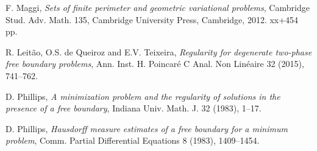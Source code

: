 \documentclass[11pt, reqno]{amsart}
\numberwithin{equation}{section}
\numberwithin{theorem}{section}
\numberwithin{lemma}{section}
\numberwithin{corollary}{section}
\numberwithin{remark}{section}
\numberwithin{proposition}{section}
\numberwithin{definition}{section}
\begin{document}
\begin{thebibliography}{99}
     F. Maggi, 
    \textit{Sets of finite perimeter and geometric variational problems}, 
    Cambridge Stud. Adv. Math. 135, Cambridge University Press, Cambridge, 2012. xx+454 pp.

     R. Leit\~ao, O.S. de Queiroz and E.V. Teixeira,
    \textit{Regularity for degenerate two-phase free boundary problems},
    Ann. Inst. H. Poincar\'e C Anal. Non Lin\'eaire 32 (2015), 741--762.

     D. Phillips, 
    \textit{A minimization problem and the regularity of solutions in the presence of a free boundary}, 
    Indiana Univ. Math. J. 32 (1983), 1--17.

     D. Phillips, 
    \textit{Hausdorff measure estimates of a free boundary for a minimum problem}, Comm. Partial Differential Equations 8 (1983), 1409--1454.    
    
\end{thebibliography}
\end{document}
